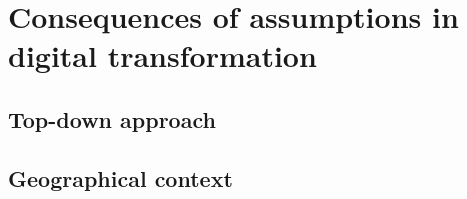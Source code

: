 \documentclass[a4]{scrartcl}
\begin{document}









\section{Consequences of assumptions in digital transformation} \label{sec:Sec2}












\subsection{Top-down approach} \label{subsec:topdown_consequences}









\subsection{Geographical context} \label{subsec:geoconsequences}


\end{document}
